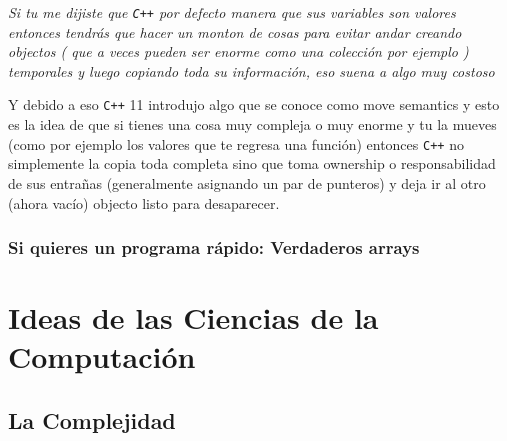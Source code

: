 \documentclass[12pt, fleqn]{report}                             %
\theoremstyle{break}                                            %
\newcommand \Cpp  {\texttt{C++} }                               %
\begin{document}
            \textit{Si tu me dijiste que \Cpp por defecto manera que sus variables son valores
            entonces tendrás que hacer un monton de cosas para evitar andar creando objectos (
                que a veces pueden ser enorme como una colección por ejemplo
            ) temporales y luego copiando toda su información, eso suena a algo muy costoso}

            Y debido a eso \Cpp 11 introdujo algo que se conoce como move semantics
            y esto es la idea de que si tienes una cosa muy compleja o muy enorme y tu la mueves
            (como por ejemplo los valores que te regresa una función) entonces \Cpp no simplemente 
            la copia toda completa sino que toma ownership o responsabilidad de sus entrañas
            (generalmente asignando un par de punteros) y deja ir al otro (ahora vacío) objecto listo para
            desaparecer.

            \cite{ModernCppWhatYouNeedToKnow}

        \clearpage
        \section{Si quieres un programa rápido: Verdaderos arrays}   
            




\part{Ideas de las Ciencias de la Computación}
    

    \clearpage
    \chapter{La Complejidad}
\end{document}
